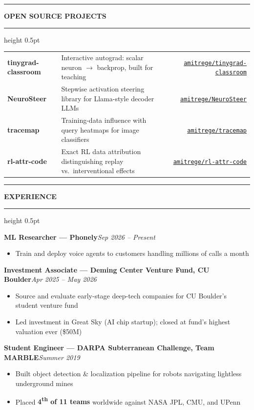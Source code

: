 \documentclass[10.5pt]{article}
\newcommand{\rezsec}[1]{%
  \vspace{8pt}%
  \noindent
  {\color{accent}\rule[-2pt]{2.4pt}{9pt}}%
  \hspace{5pt}%
  {\small\bfseries\color{navy}\MakeUppercase{#1}}%
  \hspace{6pt}%
  {\color{rule}\leaders\hrule height 0.5pt\hfill\kern0pt}%
  \vspace{2pt}\par%
}
\newcommand{\expentry}[2]{%
  {\small\textbf{#1}\hfill\textit{\color{muted}#2}}\par
}
\begin{document}
\rezsec{Open Source Projects}
{\small
\renewcommand{\arraystretch}{1.25}
\begin{tabularx}{\linewidth}{@{}l X r@{}}
  \textbf{tinygrad-classroom} &
    Interactive autograd: scalar neuron $\to$ backprop, built for teaching &
    \href{https://github.com/amitrege/tinygrad-classroom}{\color{accent}\texttt{amitrege/tinygrad-classroom}}\\
  \textbf{NeuroSteer} &
    Stepwise activation steering library for Llama-style decoder LLMs &
    \href{https://github.com/amitrege/NeuroSteer}{\color{accent}\texttt{amitrege/NeuroSteer}}\\
  \textbf{tracemap} &
    Training-data influence with query heatmaps for image classifiers &
    \href{https://github.com/amitrege/tracemap}{\color{accent}\texttt{amitrege/tracemap}}\\
  \textbf{rl-attr-code} &
    Exact RL data attribution distinguishing replay vs.\ interventional effects &
    \href{https://github.com/amitrege/rl-attr-code}{\color{accent}\texttt{amitrege/rl-attr-code}}\\
\end{tabularx}
}

\rezsec{Experience}

\expentry{ML Researcher — Phonely}{Sep 2026 – Present}
\begin{itemize}
  \item Train and deploy voice agents to customers handling millions of calls a month
\end{itemize}

\vspace{3pt}
\expentry{Investment Associate — Deming Center Venture Fund, CU Boulder}{Apr 2025 – May 2026}
\begin{itemize}
  \item Source and evaluate early-stage deep-tech companies for CU Boulder's student venture fund
  \item Led investment in Great Sky (AI chip startup); closed at fund's highest valuation ever (\$50M)
\end{itemize}

\vspace{3pt}
\expentry{Student Engineer — DARPA Subterranean Challenge, Team MARBLE}{Summer 2019}
\begin{itemize}
  \item Built object detection \& localization pipeline for robots navigating lightless underground mines
  \item Placed \textbf{4\textsuperscript{th} of 11 teams} worldwide against NASA JPL, CMU, and UPenn
\end{itemize}
\end{document}
